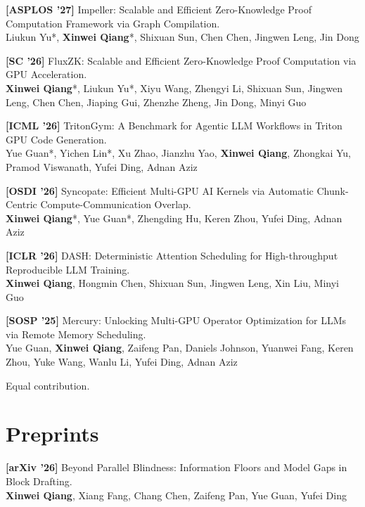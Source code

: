 \documentclass[10pt, letterpaper]{article}
\newcommand{\pubsep}{\vspace{3pt}}
\newcommand{\venue}[1]{\textbf{[#1]}}
\begin{document}
\pubsep

\venue{ASPLOS '27}
Impeller: Scalable and Efficient Zero-Knowledge Proof
Computation Framework via Graph Compilation.\\
Liukun Yu*, \textbf{Xinwei Qiang}*, Shixuan Sun,
Chen Chen, Jingwen Leng, Jin Dong

\pubsep

\venue{SC '26}
FluxZK: Scalable and Efficient Zero-Knowledge Proof Computation via GPU Acceleration.\\
\textbf{Xinwei Qiang}*, Liukun Yu*, Xiyu Wang, Zhengyi Li,
Shixuan Sun, Jingwen Leng, Chen Chen, Jiaping Gui,
Zhenzhe Zheng, Jin Dong, Minyi Guo

\pubsep

\venue{ICML '26}
TritonGym: A Benchmark for Agentic LLM Workflows in Triton GPU Code Generation.\\
Yue Guan*, Yichen Lin*, Xu Zhao, Jianzhu Yao,
\textbf{Xinwei Qiang}, Zhongkai Yu, Pramod Viswanath,
Yufei Ding, Adnan Aziz

\pubsep

\venue{OSDI '26}
Syncopate: Efficient Multi-GPU AI Kernels via Automatic
Chunk-Centric Compute-Communication Overlap.\\
\textbf{Xinwei Qiang}*, Yue Guan*, Zhengding Hu, Keren Zhou,
Yufei Ding, Adnan Aziz

\pubsep

\venue{ICLR '26}
DASH: Deterministic Attention Scheduling for High-throughput
Reproducible LLM Training.\\
\textbf{Xinwei Qiang}, Hongmin Chen, Shixuan Sun,
Jingwen Leng, Xin Liu, Minyi Guo

\pubsep

\venue{SOSP '25}
Mercury: Unlocking Multi-GPU Operator Optimization for LLMs
via Remote Memory Scheduling.\\
Yue Guan, \textbf{Xinwei Qiang}, Zaifeng Pan,
Daniels Johnson, Yuanwei Fang, Keren Zhou, Yuke Wang,
Wanlu Li, Yufei Ding, Adnan Aziz

\vspace{2pt}

{\small * Equal contribution.}

\section{Preprints}

\venue{arXiv '26}
Beyond Parallel Blindness: Information Floors and Model Gaps
in Block Drafting.\\
\textbf{Xinwei Qiang}, Xiang Fang, Chang Chen, Zaifeng Pan, Yue Guan, Yufei Ding
\end{document}
